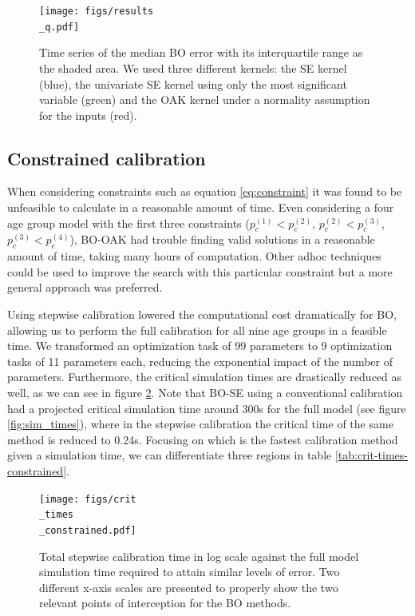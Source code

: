 \documentclass{IOS-Book-Article}
\begin{document}
	\begin{figure}[h!]
		\centering	
		\texttt{[image: figs/results\\\_q.pdf]}		
		\caption{Time series of the median BO error with its interquartile range as the shaded area. We used three different kernels: the SE kernel (blue), the univariate SE kernel using only the most significant variable (green) and the OAK kernel under a normality assumption for the inputs (red).}
		\label{fig:results_oak}	
	\end{figure}

	\subsection{Constrained calibration}
	When considering constraints such as equation \ref{eq:constraint} it was found to be unfeasible to calculate in a reasonable amount of time. Even considering a four age group model with the first three constraints ($p_c^{(1)} < p_c^{(2)}$, $p_c^{(2)} < p_c^{(3)}$, $p_c^{(3)} < p_c^{(4)}$), BO-OAK had trouble finding valid solutions in a reasonable amount of time, taking many hours of computation. Other adhoc techniques could be used to improve the search with this particular constraint but a more general approach was preferred.
	
	Using stepwise calibration lowered the computational cost dramatically for BO, allowing us to perform the full calibration for all nine age groups in a feasible time. We transformed an optimization task of 99 parameters to 9 optimization tasks of 11 parameters each, reducing the exponential impact of the number of parameters. Furthermore, the critical simulation times are drastically reduced as well, as we can see in figure \ref{fig:crit-times-constrained}. Note that BO-SE using a conventional calibration had a projected critical simulation time around 300s for the full model (see figure \ref{fig:sim_times}), where in the stepwise calibration the critical time of the same method is reduced to 0.24s. Focusing on which is the fastest calibration method given a simulation time, we can differentiate three regions in table \ref{tab:crit-times-constrained}.
		
	\begin{figure}[h!]
		\centering	
		\texttt{[image: figs/crit\\\_times\\\_constrained.pdf]}		
		\caption{Total stepwise calibration time in log scale against the full model simulation time required to attain similar levels of error. Two different x-axis scales are presented to properly show the two relevant points of interception for the BO methods.}
		\label{fig:crit-times-constrained}	
	\end{figure}
\end{document}

